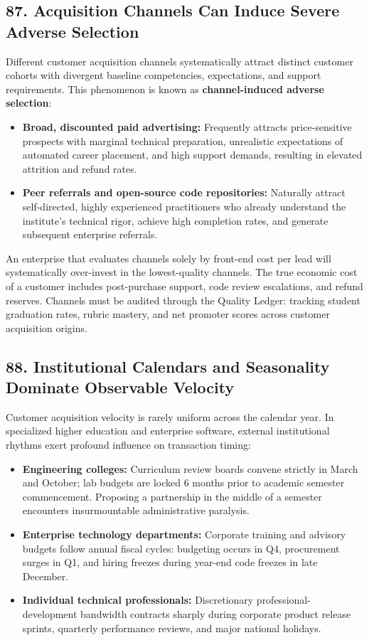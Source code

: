 \subsection*{87. Acquisition Channels Can Induce Severe Adverse Selection}

Different customer acquisition channels systematically attract distinct customer cohorts with divergent baseline competencies, expectations, and support requirements. This phenomenon is known as \textbf{channel-induced adverse selection}:
\begin{itemize}[leftmargin=*,itemsep=1pt]
  \item \textbf{Broad, discounted paid advertising:} Frequently attracts price-sensitive prospects with marginal technical preparation, unrealistic expectations of automated career placement, and high support demands, resulting in elevated attrition and refund rates.
  \item \textbf{Peer referrals and open-source code repositories:} Naturally attract self-directed, highly experienced practitioners who already understand the institute's technical rigor, achieve high completion rates, and generate subsequent enterprise referrals.
\end{itemize}

An enterprise that evaluates channels solely by front-end cost per lead will systematically over-invest in the lowest-quality channels. The true economic cost of a customer includes post-purchase support, code review escalations, and refund reserves. Channels must be audited through the Quality Ledger: tracking student graduation rates, rubric mastery, and net promoter scores across customer acquisition origins.

\subsection*{88. Institutional Calendars and Seasonality Dominate Observable Velocity}

Customer acquisition velocity is rarely uniform across the calendar year. In specialized higher education and enterprise software, external institutional rhythms exert profound influence on transaction timing:
\begin{itemize}[leftmargin=*,itemsep=1pt]
  \item \textbf{Engineering colleges:} Curriculum review boards convene strictly in March and October; lab budgets are locked 6 months prior to academic semester commencement. Proposing a partnership in the middle of a semester encounters insurmountable administrative paralysis.
  \item \textbf{Enterprise technology departments:} Corporate training and advisory budgets follow annual fiscal cycles: budgeting occurs in Q4, procurement surges in Q1, and hiring freezes during year-end code freezes in late December.
  \item \textbf{Individual technical professionals:} Discretionary professional-development bandwidth contracts sharply during corporate product release sprints, quarterly performance reviews, and major national holidays.
\end{itemize}

